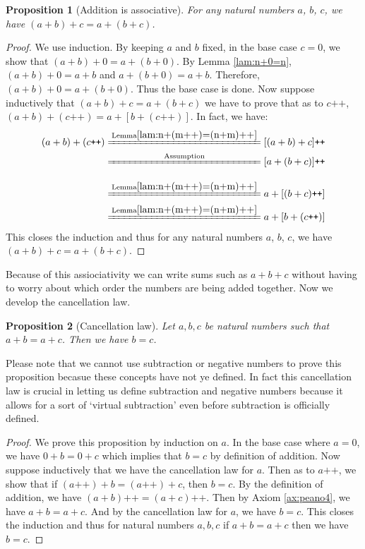 \documentclass[a4paper]{book}
\newtheorem*{proof}{\textit{Proof.}}
\newtheorem{proposition}{Proposition}[section]
\begin{document}
			\begin{proposition}[Addition is associative]
				For any natural numbers $a$, $b$, $c$, we have $(a+b)+c=a+(b+c)$.
			\end{proposition}
			\begin{proof}
				We use induction. By keeping $a$ and $b$ fixed, in the base case $c=0$, we show that $(a+b)+0=a+(b+0)$. By Lemma \ref{lam:n+0=n}, $(a+b)+0=a+b$ and $a+(b+0)=a+b$. Therefore, $(a+b)+0=a+(b+0)$. Thus the base case is done. Now suppose inductively that $(a+b)+c=a+(b+c)$ we have to prove that as to $c\texttt{++}$, $(a+b)+(c\texttt{++})=a+[b+(c\texttt{++})]$. In fact, we have:
				\begin{align*}
					(a+b)+(c\texttt{++})&\xlongequal{\mathrm{Lemma \ref{lam:n+(m++)=(n+m)++}}}[(a+b)+c]\texttt{++}\\
					&\xlongequal[\phantom{\mathrm{Lemma \ref{lam:n+(m++)=(n+m)++}}}]{\mathrm{Assumption}}[a+(b+c)]\texttt{++}\\
					&\xlongequal{\mathrm{Lemma \ref{lam:n+(m++)=(n+m)++}}}a+[(b+c)\texttt{++}]\\
					&\xlongequal{\mathrm{Lemma \ref{lam:n+(m++)=(n+m)++}}}a+[b+(c\texttt{++})]
				\end{align*}
				This closes the induction and thus for any natural numbers $a$, $b$, $c$, we have $(a+b)+c=a+(b+c)$.
			\end{proof}
			Because of this assiociativity we can write sums such as $a+b+c$ without having to worry about which order the numbers are being added together.
			Now we develop the cancellation law.
			\begin{proposition}[Cancellation law]
				Let $a,b,c$ be natural numbers such that $a+b=a+c$. Then we have $b=c$.
			\end{proposition}
			Please note that we cannot use subtraction or negative numbers to prove this proposition becasue these concepts have not ye defined. In fact this cancellation law is crucial in letting us define subtraction and negative numbers because it allows for a sort of `virtual subtraction' even before subtraction is officially defined.
			\begin{proof}
				We prove this proposition by induction on $a$. In the base case where $a=0$, we have $0+b=0+c$ which implies that $b=c$ by definition of addition. Now suppose inductively that we have the cancellation law for $a$. Then as to $a\texttt{++}$, we show that if $(a\texttt{++})+b=(a\texttt{++})+c$, then $b=c$. By the definition of addition, we have $(a+b)\texttt{++}=(a+c)\texttt{++}$. Then by Axiom \ref{ax:peano4}, we have $a+b=a+c$. And by the cancellation law for $a$, we have $b=c$. This closes the induction and thus for natural numbers $a,b,c$ if $a+b=a+c$ then we have $b=c$.
			\end{proof}
\end{document}
